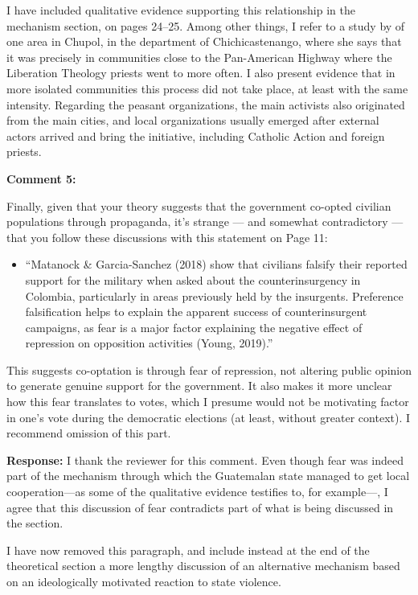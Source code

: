 \documentclass[12pt, a4paper, notitlepage]{article}
\begin{document}
I have included qualitative evidence supporting this relationship in the mechanism section, on pages 24--25. Among other things, I refer to a study by \citet{Esparza:2018uw} of one area in Chupol, in the department of Chichicastenango, where she says that it was precisely in communities close to the Pan-American Highway where the Liberation Theology priests went to more often. I also present evidence that in more isolated communities this process did not take place, at least with the same intensity. Regarding the peasant organizations, the main activists also originated from the main cities, and local organizations usually emerged after external actors arrived and bring the initiative, including Catholic Action and foreign priests.

\vspace{15pt}
\noindent\textbf{Comment 5:}
\begin{displayquote}
Finally, given that your theory suggests that the government co-opted civilian populations through propaganda, it’s strange — and somewhat contradictory — that you follow these discussions with this statement on Page 11:
\begin{itemize}
  \item[] ``Matanock \& Garcia-Sanchez (2018) show that civilians falsify their reported support for the military when asked about the counterinsurgency in Colombia, particularly in areas previously held by the insurgents. Preference falsification helps to explain the apparent success of counterinsurgent campaigns, as fear is a major factor explaining the negative effect of repression on opposition activities (Young, 2019).''
\end{itemize}
This suggests co-optation is through fear of repression, not altering public opinion to generate genuine support for the government. It also makes it more unclear how this fear translates to votes, which I presume would not be motivating factor in one’s vote during the democratic elections (at least, without greater context). I recommend omission of this part.
\end{displayquote}

\noindent\textbf{Response:} I thank the reviewer for this comment. Even though fear was indeed part of the mechanism through which the Guatemalan state managed to get local cooperation---as some of the qualitative evidence testifies to, for example---, I agree that this discussion of fear contradicts part of what is being discussed in the section.

I have now removed this paragraph, and include instead at the end of the theoretical section a more lengthy discussion of an alternative mechanism based on an ideologically motivated reaction to state violence.
\end{document}
